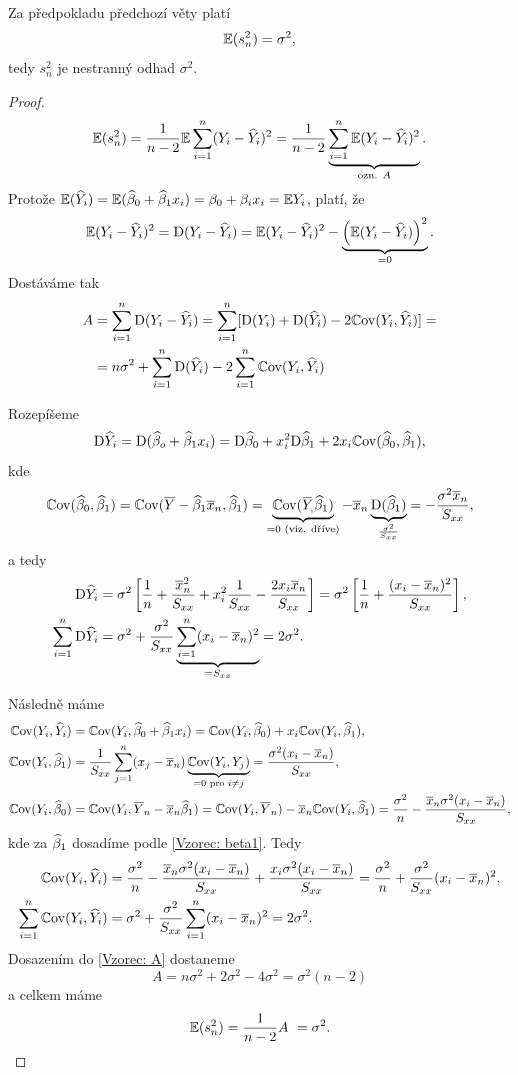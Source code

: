 


\begin{theorem}
	Za předpokladu předchozí věty platí
	 $$
		\mathbb{E} (s_n^2) = \sigma^2,
	 $$
	tedy $s_n^2$ je nestranný odhad $\sigma^2$.
\end{theorem}


\begin{proof}
	 $$
		\mathbb{E}(s_n^2) = \frac{1}{n-2} \mathbb{E} \sum\limits_{i=1}^{n} (Y_i - \widehat{Y}_i)^2 = \frac{1}{n-2} \underbrace{\sum\limits_{i=1}^{n} \mathbb{E} (Y_i - \widehat{Y}_i)^2}_{\text{ozn. } A}.
	 $$
	Protože $\mathbb{E}(\widehat{Y}_i) = \mathbb{E}(\widehat{\beta}_0 + \widehat{\beta}_1 x_i) = \beta_0 + \beta_i x_i = \mathbb{E} Y_i$, platí, že
	 $$
	\mathbb{E}(Y_i - \widehat{Y}_i)^2 = \mathrm{D}(Y_i - \widehat{Y}_i) = \mathbb{E} (Y_i - \widehat{Y}_i)^2 - \underbrace{\left(\mathbb{E}(Y_i - \widehat{Y}_i)\right)^2}_{ = 0}.
	 $$
	Dostáváme tak	
	\begin{align}
		A & = \sum\limits_{i=1}^{n} \mathrm{D}(Y_i - \widehat{Y}_i) = \sum\limits_{i=1}^{n} [\mathrm{D}(Y_i) + \mathrm{D}(\widehat{Y}_i) - 2 \mathbb{C}\mathrm{ov}(Y_i, \widehat{Y}_i)] = \notag \\
		& = n \sigma^2 + \sum\limits_{i=1}^{n} \mathrm{D}(\widehat{Y}_i) - 2 \sum\limits_{i=1}^{n} \mathbb{C}\mathrm{ov}(Y_i, \widehat{Y}_i) \label{Vzorec: A}
	\end{align}
	
	Rozepíšeme
	 $$
		\mathrm{D} \widehat{Y}_i = \mathrm{D}(\widehat{\beta}_o + \widehat{\beta}_1 x_i) = \mathrm{D} \widehat{\beta}_0 + x_i^2 \mathrm{D} \widehat{\beta}_1 + 2 x_i \mathbb{C}\mathrm{ov} (\widehat{\beta}_0,\widehat{\beta}_1),
	 $$
	kde
	 $$
		\Cov(\wbeta_0, \wbeta_1) = \Cov(\lY  - \wbeta_1 \lxn, \wbeta_1) = \underbrace{\Cov(\oy, \wbeta_1)}_{ = 0 \text{ (viz. dříve)}} - \lxn \underbrace{\D(\wbeta_1)}_{\frac{\sigma^2}{\Sxx}} = -\frac{\sigma^2 \lxn}{\Sxx},
	 $$
	a tedy
	\begin{align*}
		\mathrm{D} \widehat{Y}_i & = \sigma^2 \left[\frac{1}{n} + \frac{\overline{x}_n^2}{S_{xx}} + x_i^2 \frac{1}{S_{xx}} - \frac{2 x_i \overline{x}_n}{S_{xx}} \right] = \sigma^2 \left[\frac{1}{n} + \frac{(x_i - \overline{x}_n)^2}{S_{xx}}\right], \\
		\sum\limits_{i=1}^{n} \mathrm{D} \widehat{Y}_i & = \sigma^2 + \frac{\sigma^2}{S_{xx}} \underbrace{\sum\limits_{i=1}^{n} (x_i - \overline{x}_n)^2}_{ = S_{xx}} = 2\sigma^2.
	\end{align*}
	
	Následně máme
	\begin{align*}
	\mathbb{C}\mathrm{ov}(Y_i, \widehat{Y}_i) & = \mathbb{C}\mathrm{ov}(Y_i, \widehat{\beta}_0 + \widehat{\beta}_1 x_i) = \mathbb{C}\mathrm{ov}(Y_i, \widehat{\beta}_0) + x_i \mathbb{C}\mathrm{ov}(Y_i, \widehat{\beta}_1), \\
	\mathbb{C}\mathrm{ov}(Y_i, \widehat{\beta}_1) & = \frac{1}{S_{xx}} \sum\limits_{j=1}^{n} (x_j - \overline{x}_n) \underbrace{\mathbb{C}\mathrm{ov}(Y_i, Y_j)}_{ = 0 \text{ pro~} i\neq j} = \frac{\sigma^2(x_i - \overline{x}_n)}{S_{xx}}, \\
	\mathbb{C}\mathrm{ov}(Y_i, \widehat{\beta}_0) & = \mathbb{C}\mathrm{ov}(Y_i, \overline{Y}_n - \overline{x}_n \widehat{\beta}_1) = \mathbb{C}\mathrm{ov}(Y_i, \overline{Y}_n) - \overline{x}_n \mathbb{C}\mathrm{ov}(Y_i, \widehat{\beta}_1) = \frac{\sigma^2}{n} - \frac{\overline{x}_n \sigma^2 (x_i - \overline{x}_n)}{S_{xx}}, 
	\end{align*}
	kde za $\widehat{\beta}_1$ dosadíme podle \eqref{Vzorec: beta1}. Tedy
	\begin{align*}
		\mathbb{C}\mathrm{ov}(Y_i, \widehat{Y}_i) & = \frac{\sigma^2}{n} - \frac{\overline{x}_n \sigma^2 (x_i - \overline{x}_n)}{S_{xx}} + \frac{x_i \sigma^2 (x_i - \overline{x}_n)}{S_{xx}} = \frac{\sigma^2}{n} + \frac{\sigma^2}{S_{xx}}(x_i - \overline{x}_n)^2, \\
		\sum\limits_{i=1}^{n} \mathbb{C}\mathrm{ov}(Y_i, \widehat{Y}_i) & = \sigma^2 + \frac{\sigma^2}{S_{xx}} \sum\limits_{i=1}^{n} (x_i - \overline{x}_n)^2 = 2 \sigma^2. 
	\end{align*}
	Dosazením do \eqref{Vzorec: A} dostaneme
	 $$
		A = n\sigma^2 + 2\sigma^2 - 4\sigma^2 = \sigma^2(n-2)
	 $$
	a celkem máme
	 $$
		\mathbb{E}(s_n^2) = \frac{1}{n-2} A~ = \sigma^2.
	 $$
\end{proof}

